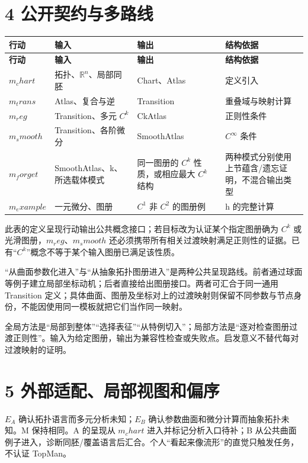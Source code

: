 \documentclass[UTF8,a4paper,zihao=-4,fontset=windows,openany]{ctexbook}
\def\mathrm#1{#1}%
\begin{document}
\section{4 公开契约与多路线}
\begingroup\small\setlength{\tabcolsep}{4pt}
\begin{longtable}{>{\raggedright\arraybackslash}p{}>{\raggedright\arraybackslash}p{}>{\raggedright\arraybackslash}p{}>{\raggedright\arraybackslash}p{}}
\toprule
\textbf{行动} & \textbf{输入} & \textbf{输出} & \textbf{结构依据} \\
\midrule
\endfirsthead
\toprule
\textbf{行动} & \textbf{输入} & \textbf{输出} & \textbf{结构依据} \\
\midrule
\endhead
\bottomrule
\endfoot
\bottomrule
\endlastfoot
\(m_\mathrm{chart}\) & 拓扑、\(\mathbb{R}^n\)、局部同胚 & Chart、Atlas & 定义引入 \\
\(m_\mathrm{trans}\) & Atlas、复合与逆 & Transition & 重叠域与映射计算 \\
\(m_\mathrm{reg}\) & Transition、多元 \(C^k\) & CkAtlas & 正则性条件 \\
\(m_\mathrm{smooth}\) & Transition、各阶微分 & SmoothAtlas & \(C^\infty\) 条件 \\
\(m_\mathrm{forget}\) & SmoothAtlas、k、所选载体模式 & 同一图册的 \(C^k\) 性质，或相应最大 \(C^k\) 结构 & 两种模式分别使用上节蕴含/遗忘证明，不混合输出类型 \\
\(m_\mathrm{example}\) & 一元微分、图册 & \(C^{1}\) 非 \(C^{2}\) 的图册例 & h 的完整计算 \\
\end{longtable}
\endgroup

此表的定义呈现行动输出公共概念接口；若目标改为认证某个指定图册确为 \(C^k\) 或光滑图册，\(m_\mathrm{reg}\)、\(m_\mathrm{smooth}\) 还必须携带所有相关过渡映射满足正则性的证据。已有\(“C^k”\)概念不等于某个输入图册已满足该性质。

“从曲面参数化进入”与“从抽象拓扑图册进入”是两种公共呈现路线。前者通过球面等例子建立局部坐标动机；后者直接给出图册接口。两者可汇合于同一通用 Transition 定义；具体曲面、图册及坐标对上的过渡映射则保留不同参数与节点身份，不能因使用同一模板就把它们当作同一映射。

全局方法是“局部到整体”“选择表征”“从特例切入”；局部方法是“逐对检查图册过渡正则性”。输入为给定图册，输出为兼容性检查或失败点。启发意义不替代每对过渡映射的证明。

\section{5 外部适配、局部视图和偏序}
\(E_A\) 确认拓扑语言而多元分析未知；\(E_B\) 确认参数曲面和微分计算而抽象拓扑未知。M 保持相同。A 的呈现从 \(m_\mathrm{chart}\) 进入并标记分析入口待补；B 从公共曲面例子进入，诊断同胚/覆盖语言后汇合。个人“看起来像流形”的直觉只触发任务，不认证 TopMan。
\end{document}
